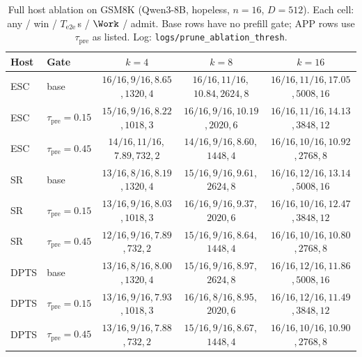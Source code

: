 \begin{table}[t]
\centering
\caption{Full host ablation on GSM8K (Qwen3-8B, hopeless, $n{=}16$, $D{=}512$).
Each cell: any / win / $T_{\mathrm{e2e}}$\,s / $\Work$ / admit.
Base rows have no prefill gate; APP rows use $\tau_{\mathrm{pre}}$ as listed.
Log: \texttt{logs/prune\_ablation\_thresh}.}
\label{tab:ablate-thresh}
\scriptsize
\setlength{\tabcolsep}{2.4pt}
\begin{tabular}{@{}llccc@{}}
\toprule
Host & Gate & $k{=}4$ & $k{=}8$ & $k{=}16$ \\
\midrule
ESC
 & base
 & $16/16$,\,$9/16$,\,$8.65$,\,$1320$,\,$4$
 & $16/16$,\,$11/16$,\,$10.84$,\,$2624$,\,$8$
 & $16/16$,\,$11/16$,\,$17.05$,\,$5008$,\,$16$ \\
\rowcolor{tblalt}
ESC
 & $\tau_{\mathrm{pre}}{=}0.15$
 & $15/16$,\,$9/16$,\,$8.22$,\,$1018$,\,$3$
 & $16/16$,\,$9/16$,\,$10.19$,\,$2020$,\,$6$
 & $16/16$,\,$11/16$,\,$14.13$,\,$3848$,\,$12$ \\
ESC
 & $\tau_{\mathrm{pre}}{=}0.45$
 & $14/16$,\,$11/16$,\,$7.89$,\,$732$,\,$2$
 & $14/16$,\,$9/16$,\,$8.60$,\,$1448$,\,$4$
 & $16/16$,\,$10/16$,\,$10.92$,\,$2768$,\,$8$ \\
\midrule
SR
 & base
 & $13/16$,\,$8/16$,\,$8.19$,\,$1320$,\,$4$
 & $15/16$,\,$9/16$,\,$9.61$,\,$2624$,\,$8$
 & $16/16$,\,$12/16$,\,$13.14$,\,$5008$,\,$16$ \\
\rowcolor{tblalt}
SR
 & $\tau_{\mathrm{pre}}{=}0.15$
 & $13/16$,\,$9/16$,\,$8.03$,\,$1018$,\,$3$
 & $16/16$,\,$9/16$,\,$9.37$,\,$2020$,\,$6$
 & $16/16$,\,$10/16$,\,$12.47$,\,$3848$,\,$12$ \\
SR
 & $\tau_{\mathrm{pre}}{=}0.45$
 & $12/16$,\,$9/16$,\,$7.89$,\,$732$,\,$2$
 & $15/16$,\,$9/16$,\,$8.64$,\,$1448$,\,$4$
 & $16/16$,\,$10/16$,\,$10.80$,\,$2768$,\,$8$ \\
\midrule
DPTS
 & base
 & $13/16$,\,$8/16$,\,$8.00$,\,$1320$,\,$4$
 & $15/16$,\,$9/16$,\,$8.97$,\,$2624$,\,$8$
 & $16/16$,\,$12/16$,\,$11.86$,\,$5008$,\,$16$ \\
\rowcolor{tblalt}
DPTS
 & $\tau_{\mathrm{pre}}{=}0.15$
 & $13/16$,\,$9/16$,\,$7.93$,\,$1018$,\,$3$
 & $16/16$,\,$8/16$,\,$8.95$,\,$2020$,\,$6$
 & $16/16$,\,$12/16$,\,$11.49$,\,$3848$,\,$12$ \\
DPTS
 & $\tau_{\mathrm{pre}}{=}0.45$
 & $13/16$,\,$9/16$,\,$7.88$,\,$732$,\,$2$
 & $15/16$,\,$9/16$,\,$8.67$,\,$1448$,\,$4$
 & $16/16$,\,$10/16$,\,$10.90$,\,$2768$,\,$8$ \\
\bottomrule
\end{tabular}
\end{table}

